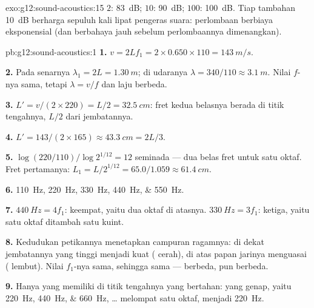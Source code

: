 \begin{solution}{exo:g12:sound-acoustics:15}
$2$: \qty{83}{dB}; $10$: \qty{90}{dB}; $100$: \qty{100}{dB}. Tiap
tambahan \qty{+10}{dB} berharga sepuluh kali lipat pengeras suara:
perlombaan  berbiaya eksponensial (dan berbahaya jauh
sebelum perlombaannya dimenangkan).
\end{solution}

\begin{solution}{pb:g12:sound-acoustics:1}
\textbf{1.} $v = 2Lf_1 = 2 \times 0.650 \times 110 = \qty{143}{m/s}$.

\textbf{2.} Pada senarnya $\lambda_1 = 2L = \qty{1.30}{m}$; di udaranya
$\lambda = 340/110 \approx \qty{3.1}{m}$. Nilai $f$-nya sama, tetapi
$\lambda = v/f$ dan laju  berbeda.

\textbf{3.} $L' = v/(2 \times 220) = L/2 = \qty{32.5}{cm}$: fret kedua
belasnya berada di titik tengahnya, $L/2$ dari jembatannya.

\textbf{4.} $L' = 143/(2 \times 165) \approx \qty{43.3}{cm} = 2L/3$.

\textbf{5.} $\log(220/110)/\log 2^{1/12} = 12$ seminada --- dua belas
fret untuk satu oktaf. Fret pertamanya:
$L_1 = L/2^{1/12} = 65.0/1.059
\approx \qty{61.4}{cm}$.

\textbf{6.} \qtylist{110;220;330;440;550}{Hz}.

\textbf{7.} $\qty{440}{Hz} = 4f_1$:  keempat, yaitu dua oktaf di
atasnya. $\qty{330}{Hz} = 3f_1$:  ketiga, yaitu satu oktaf
ditambah satu kuint.

\textbf{8.} Kedudukan petikannya menetapkan campuran ragamnya: di dekat
jembatannya  yang tinggi menjadi kuat ( cerah), di
atas papan jarinya  menguasai ( lembut). Nilai
$f_1$-nya sama, sehingga  sama ---  berbeda,
 pun berbeda.

\textbf{9.} Hanya  yang memiliki  di titik tengahnya yang
bertahan: yang genap, yaitu \qtylist{220;440;660}{Hz}, \dots {} melompat satu oktaf, menjadi \qty{220}{Hz}.


\end{solution}
